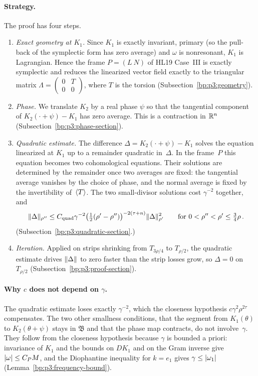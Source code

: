 \paragraph{Strategy.} The proof has four steps.
\begin{enumerate}[label=(\arabic*)]
\item \emph{Exact geometry at $K_1$.} Since $K_1$ is exactly invariant, primary (so the pull-back of the
  symplectic form has zero average) and $\omega$ is nonresonant, $K_1$ is Lagrangian. Hence the frame $P=(L\ N)$ of HL19 Case~III is exactly symplectic and reduces the
  linearized vector field exactly to the triangular matrix
  $\Lambda=\left(\begin{smallmatrix}0&T\\0&0\end{smallmatrix}\right)$, where $T$ is the torsion
  (Subsection~\ref{bp:p3:geometry}).
\item \emph{Phase.} We translate $K_2$ by a real phase $\psi$ so that the tangential component of
  $K_2(\cdot+\psi)-K_1$ has zero average. This is a contraction in $\mathbb{R}^n$
  (Subsection~\ref{bp:p3:phase-section}).
\item \emph{Quadratic estimate.} The difference $\Delta=K_2(\cdot+\psi)-K_1$ solves the equation
  linearized at $K_1$ up to a remainder quadratic in~$\Delta$. In the frame~$P$ this equation becomes two
  cohomological equations. Their solutions are determined by the remainder once two averages are fixed:
  the tangential average vanishes by the choice of phase, and the normal average is fixed by the
  invertibility of~$\langle T\rangle$. The two small-divisor solutions cost $\gamma^{-2}$ together, and
  \begin{equation*}
  \lVert \Delta\rVert_{\rho''}\le C_{\mathrm{quad}}\gamma^{-2}\bigl(\tfrac12(\rho'-\rho'')\bigr)^{-2(\tau+n)}
  \lVert \Delta\rVert_{\rho'}^2\qquad\text{for }0<\rho''<\rho'\le\tfrac34\rho\,.
  \end{equation*}
  (Subsection~\ref{bp:p3:quadratic-section}.)
\item \emph{Iteration.} Applied on strips shrinking from $T_{3\rho/4}$ to $T_{\rho/2}$, the quadratic
  estimate drives $\lVert \Delta\rVert$ to zero faster than the strip losses grow, so $\Delta=0$ on $T_{\rho/2}$
  (Subsection~\ref{bp:p3:proof-section}).
\end{enumerate}

\paragraph{Why $c$ does not depend on $\gamma$.} The quadratic estimate loses exactly $\gamma^{-2}$,
which the closeness hypothesis $c\gamma^2\rho^{2\tau}$ compensates. The two other smallness conditions,
that the segment from $K_1(\theta)$ to $K_2(\theta+\psi)$ stays in $\mathfrak B$ and that the phase map
contracts, do not involve~$\gamma$. They follow from the closeness hypothesis because $\gamma$ is bounded
a priori: invariance of $K_1$ and the bounds on $DK_1$ and on the Gram inverse give $\lvert \omega\rvert\le C_PM$,
and the Diophantine inequality for $k=e_1$ gives $\gamma\le\lvert \omega_1\rvert$
(Lemma~\ref{bp:p3:frequency-bound}).

